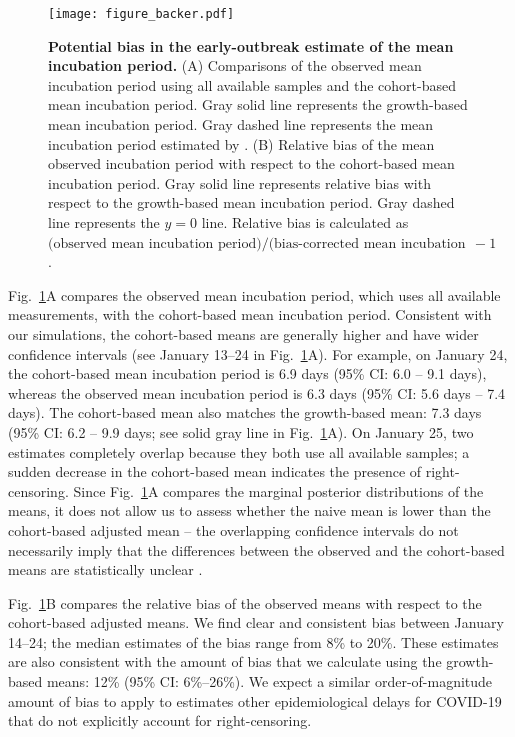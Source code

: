 \documentclass[12pt]{article}
\newcommand{\fref}[1]{Fig.~\ref{fig:#1}}
\begin{document}
\begin{figure}[!th]
\texttt{[image: figure\_backer.pdf]}
\caption{
\textbf{Potential bias in the early-outbreak estimate of the mean incubation period.}
(A) Comparisons of the observed mean incubation period using all available samples and the cohort-based mean incubation period.
Gray solid line represents the growth-based mean incubation period.
Gray dashed line represents the mean incubation period estimated by \cite{backer2020incubation}.
(B) Relative bias of the mean observed incubation period with respect to the cohort-based mean incubation period.
Gray solid line represents relative bias with respect to the growth-based mean incubation period.
Gray dashed line represents the $y=0$ line.
Relative bias is calculated as $\textrm{(observed mean incubation period)/(bias-corrected mean incubation period)} - 1$.
}
\label{fig:backer}
\end{figure}

\fref{backer}A compares the observed mean incubation period, which uses all available measurements, with the cohort-based mean incubation period.
Consistent with our simulations, the cohort-based means are generally higher and have wider confidence intervals (see January 13--24 in \fref{backer}A).
For example, on January 24, the cohort-based mean incubation period is 6.9 days (95\% CI: 6.0 -- 9.1 days), whereas the observed mean incubation period is 6.3 days (95\% CI: 5.6 days -- 7.4 days).
The cohort-based mean also matches the growth-based mean: 7.3 days (95\% CI: 6.2 -- 9.9 days; see solid gray line in \fref{backer}A).
On January 25, two estimates completely overlap because they both use all available samples; a sudden decrease in the cohort-based mean indicates the presence of right-censoring.
Since \fref{backer}A compares the marginal posterior distributions of the means, it does not allow us to assess whether the naive mean is lower than the cohort-based adjusted mean -- the overlapping confidence intervals do not necessarily imply that the differences between the observed and the cohort-based means are statistically unclear \citep{dushoff2019can}.

\fref{backer}B compares the relative bias of the observed means with respect to the cohort-based adjusted means.
We find clear and consistent bias between January 14--24;
the median estimates of the bias range from 8\% to 20\%.
These estimates are also consistent with the amount of bias that we calculate using the growth-based means: 12\% (95\% CI: 6\%--26\%).
We expect a similar order-of-magnitude amount of bias to apply to estimates other epidemiological delays for COVID-19 that do not explicitly account for right-censoring.
\end{document}
